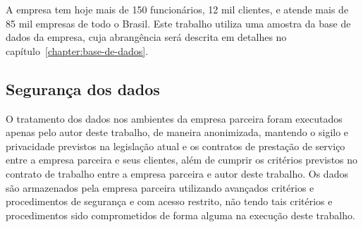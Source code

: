 A empresa tem hoje mais de 150 funcionários, 12 mil clientes, e atende mais de 85 mil empresas de todo o Brasil. Este trabalho utiliza uma amostra da base de dados da empresa, cuja abrangência será descrita em detalhes no capítulo~\ref{chapter:base-de-dados}.

\subsection{Segurança dos dados}
\label{section:documentos-fiscais:seguranca}

O tratamento dos dados nos ambientes da empresa parceira foram executados apenas pelo autor deste trabalho, de maneira anonimizada, mantendo o sigilo e privacidade previstos na legislação atual e os contratos de prestação de serviço entre a empresa parceira e seus clientes, além de cumprir os critérios previstos no contrato de trabalho entre a empresa parceira e autor deste trabalho. Os dados são armazenados pela empresa parceira utilizando avançados critérios e procedimentos de segurança e com acesso restrito, não tendo tais critérios e procedimentos sido comprometidos de forma alguma na execução deste trabalho.
